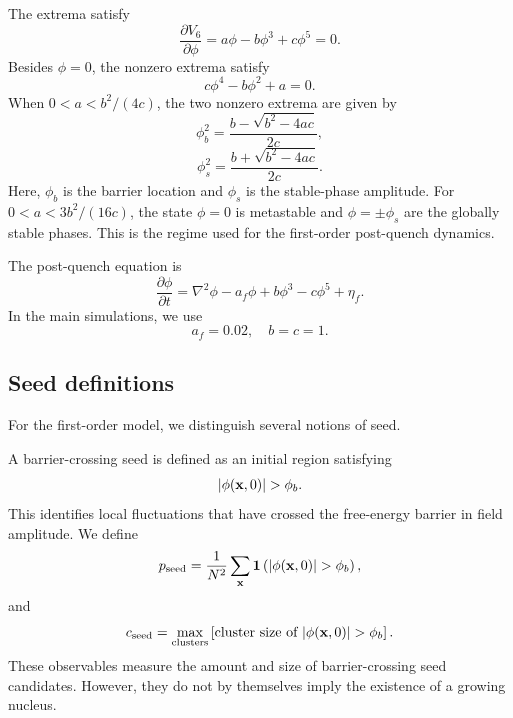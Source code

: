 ﻿\documentclass[aps,pre,preprint,showkeys,amsmath,amssymb,superscriptaddress,longbibliography]{revtex4-2}
\begin{document}
The extrema satisfy
\begin{equation}
\frac{\partial V_6}{\partial \phi}=a\phi-b\phi^3+c\phi^5=0.
\end{equation}
Besides $\phi=0$, the nonzero extrema satisfy
\begin{equation}
c\phi^4-b\phi^2+a=0.
\end{equation}
When $0<a<b^2/(4c)$, the two nonzero extrema are given by
\begin{equation}
\phi_b^2=\frac{b-\sqrt{b^2-4ac}}{2c},
\end{equation}
\begin{equation}
\phi_s^2=\frac{b+\sqrt{b^2-4ac}}{2c}.
\end{equation}
Here, $\phi_b$ is the barrier location and $\phi_s$ is the stable-phase amplitude. For $0<a<3b^2/(16c)$, the state $\phi=0$ is metastable and $\phi=\pm\phi_s$ are the globally stable phases. This is the regime used for the first-order post-quench dynamics.

The post-quench equation is
\begin{equation}
\frac{\partial \phi}{\partial t}=\nabla^2\phi-a_f\phi+b\phi^3-c\phi^5+\eta_f.
\end{equation}
In the main simulations, we use
\begin{equation}
a_f=0.02,\quad b=c=1.
\end{equation}

\subsection{Seed definitions}\label{seed-definitions}

For the first-order model, we distinguish several notions of seed.

A barrier-crossing seed is defined as an initial region satisfying
\begin{equation}
|\phi({\bf x},0)|>\phi_b.
\end{equation}
This identifies local fluctuations that have crossed the free-energy barrier in field amplitude. We define
\begin{equation}
p_{\rm seed}=\frac{1}{N^2}\sum_{\bf x}{\bf 1}\left(|\phi({\bf x},0)|>\phi_b\right),
\end{equation}
and
\begin{equation}
c_{\rm seed}=\max_{\rm clusters}\left[\text{cluster size of }|\phi({\bf x},0)|>\phi_b\right].
\end{equation}
These observables measure the amount and size of barrier-crossing seed candidates. However, they do not by themselves imply the existence of a growing nucleus.
\end{document}
